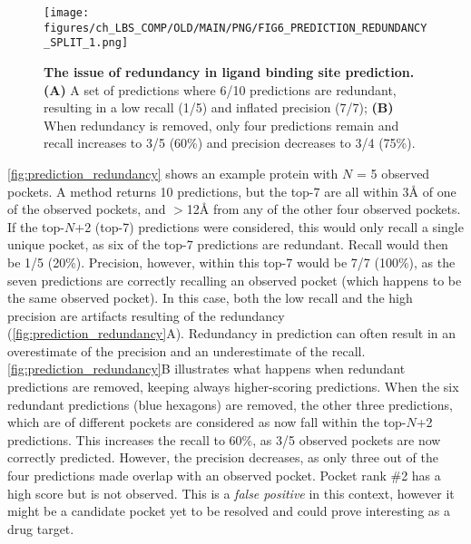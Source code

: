 \begin{figure}[htb!]
    \centering
    \texttt{[image: figures/ch\_LBS\_COMP/OLD/MAIN/PNG/FIG6\_PREDICTION\_REDUNDANCY\_SPLIT\_1.png]}
    \caption[The issue of redundancy in ligand binding site prediction]{\textbf{The issue of redundancy in ligand binding site prediction.} \textbf{(A)} A set of predictions where 6/10 predictions are redundant, resulting in a low recall (1/5) and inflated precision (7/7); \textbf{(B)} When redundancy is removed, only four predictions remain and recall increases to 3/5 (60\%) and precision decreases to 3/4 (75\%).}
    \label{fig:prediction_redundancy}
\end{figure}

\FloatBarrier

\autoref{fig:prediction_redundancy} shows an example protein with $N$ = 5 observed pockets. A method returns 10 predictions, but the top-7 are all within 3\AA{} of one of the observed pockets, and $>$12\AA{} from any of the other four observed pockets. If the top-$N$+2 (top-7) predictions were considered, this would only recall a single unique pocket, as six of the top-7 predictions are redundant. Recall would then be 1/5 (20\%). Precision, however, within this top-7 would be 7/7 (100\%), as the seven predictions are correctly recalling an observed pocket (which happens to be the same observed pocket). In this case, both the low recall and the high precision are artifacts resulting of the redundancy (\autoref{fig:prediction_redundancy}A). Redundancy in prediction can often result in an overestimate of the precision and an underestimate of the recall. \autoref{fig:prediction_redundancy}B illustrates what happens when redundant predictions are removed, keeping always higher-scoring predictions. When the six redundant predictions (blue hexagons) are removed, the other three predictions, which are of different pockets are considered as now fall within the top-$N$+2 predictions. This increases the recall to 60\%, as 3/5 observed pockets are now correctly predicted. However, the precision decreases, as only three out of the four predictions made overlap with an observed pocket. Pocket rank \#2 has a high score but is not observed. This is a \textit{false positive} in this context, however it might be a candidate pocket yet to be resolved and could prove interesting as a drug target.

